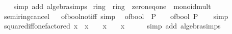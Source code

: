 \begin{isabellebody}
%
\isadelimproof
\ \ %
\endisadelimproof
%
\isatagproof
{}\isamarkupfalse%
\ {\isacharparenleft}{\kern0pt}simp\ add{\isacharcolon}{\kern0pt}\ algebra{\isacharunderscore}{\kern0pt}simps{\isacharparenright}{\kern0pt}%
\endisatagproof
{\isafoldproof}%
%
\isadelimproof
\isanewline
%
\endisadelimproof
\isanewline
{}\isamarkupfalse%
\isanewline
\isanewline
{}\isamarkupfalse%
\ ring{\isacharunderscore}{\kern0pt}{}\ {\isacharequal}{\kern0pt}\ ring\ {\isacharplus}{\kern0pt}\ zero{\isacharunderscore}{\kern0pt}neq{\isacharunderscore}{\kern0pt}one\ {\isacharplus}{\kern0pt}\ monoid{\isacharunderscore}{\kern0pt}mult\isanewline
{}\isanewline
\isanewline
{}\isamarkupfalse%
\ semiring{\isacharunderscore}{\kern0pt}{}{\isacharunderscore}{\kern0pt}cancel%
\isadelimproof
\ %
\endisadelimproof
%
\isatagproof
\isacommand{{\isachardot}{\kern0pt}{\isachardot}{\kern0pt}}\isamarkupfalse%
%
\endisatagproof
{\isafoldproof}%
%
\isadelimproof
%
\endisadelimproof
\isanewline
\isanewline
{}\isamarkupfalse%
\ of{\isacharunderscore}{\kern0pt}bool{\isacharunderscore}{\kern0pt}not{\isacharunderscore}{\kern0pt}iff\ {\isacharbrackleft}{\kern0pt}simp{\isacharbrackright}{\kern0pt}{\isacharcolon}{\kern0pt}\isanewline
\ \ {\isacartoucheopen}of{\isacharunderscore}{\kern0pt}bool\ {\isacharparenleft}{\kern0pt}{\isasymnot}\ P{\isacharparenright}{\kern0pt}\ {\isacharequal}{\kern0pt}\ {}\ {\isacharminus}{\kern0pt}\ of{\isacharunderscore}{\kern0pt}bool\ P{\isacartoucheclose}\isanewline
%
\isadelimproof
\ \ %
\endisadelimproof
%
\isatagproof
{}\isamarkupfalse%
\ simp%
\endisatagproof
{\isafoldproof}%
%
\isadelimproof
\isanewline
%
\endisadelimproof
\isanewline
{}\isamarkupfalse%
\ square{\isacharunderscore}{\kern0pt}diff{\isacharunderscore}{\kern0pt}one{\isacharunderscore}{\kern0pt}factored{\isacharcolon}{\kern0pt}\ {\isachardoublequoteopen}x\ {\isacharasterisk}{\kern0pt}\ x\ {\isacharminus}{\kern0pt}\ {}\ {\isacharequal}{\kern0pt}\ {\isacharparenleft}{\kern0pt}x\ {\isacharplus}{\kern0pt}\ {}{\isacharparenright}{\kern0pt}\ {\isacharasterisk}{\kern0pt}\ {\isacharparenleft}{\kern0pt}x\ {\isacharminus}{\kern0pt}\ {}{\isacharparenright}{\kern0pt}{\isachardoublequoteclose}\isanewline
%
\isadelimproof
\ \ %
\endisadelimproof
%
\isatagproof
{}\isamarkupfalse%
\ {\isacharparenleft}{\kern0pt}simp\ add{\isacharcolon}{\kern0pt}\ algebra{\isacharunderscore}{\kern0pt}simps{\isacharparenright}{\kern0pt}%
\endisatagproof

\end{isabellebody}
